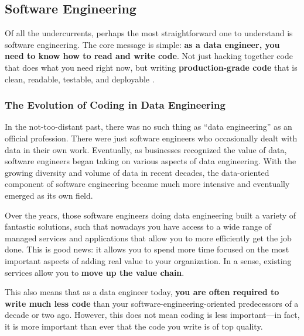 \documentclass{article}
\begin{document}
\subsection{Software Engineering}
\label{sec:software-engineering}
Of all the undercurrents, perhaps the most straightforward one to understand is software engineering. The core message is simple: \textbf{as a data engineer, you need to know how to read and write code}. Not just hacking together code that does what you need right now, but writing \textbf{production-grade code} that is clean, readable, testable, and deployable \cite{martin2008clean, reis2022fundamentals}.

\subsubsection{The Evolution of Coding in Data Engineering}
In the not-too-distant past, there was no such thing as ``data engineering'' as an official profession. There were just software engineers who occasionally dealt with data in their own work. Eventually, as businesses recognized the value of data, software engineers began taking on various aspects of data engineering. With the growing diversity and volume of data in recent decades, the data-oriented component of software engineering became much more intensive and eventually emerged as its own field.

Over the years, those software engineers doing data engineering built a variety of fantastic solutions, such that nowadays you have access to a wide range of managed services and applications that allow you to more efficiently get the job done. This is good news: it allows you to spend more time focused on the most important aspects of adding real value to your organization. In a sense, existing services allow you to \textbf{move up the value chain}.

This also means that as a data engineer today, \textbf{you are often required to write much less code} than your software-engineering-oriented predecessors of a decade or two ago. However, this does not mean coding is less important---in fact, it is more important than ever that the code you write is of top quality.
\end{document}
